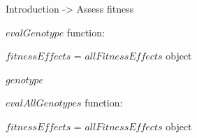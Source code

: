 \begin{frame}{Introduction -> Assess fitness}

    \begin{itemize1}
        \item $evalGenotype$ function:
        \begin{itemize2}
            \item $fitnessEffects$ = $allFitnessEffects$ object
            \item $genotype$
        \end{itemize2}
        \item $evalAllGenotypes$ function:
        \begin{itemize2}
            \item $fitnessEffects$ = $allFitnessEffects$ object
        \end{itemize2}
    \end{itemize1}
    
\end{frame}

